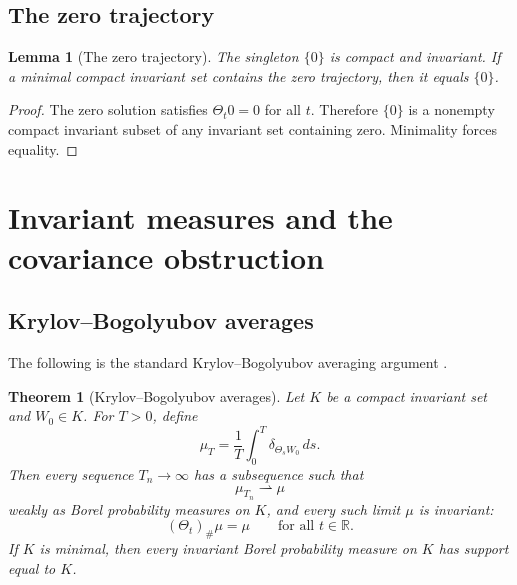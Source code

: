 \documentclass[11pt]{amsart}
\theoremstyle{plain}
\newtheorem{theorem}{Theorem}[section]
\newtheorem{lemma}[lemma]{Lemma}
\theoremstyle{definition}
\theoremstyle{remark}
\numberwithin{equation}{section}
\newcommand{\R}{\mathbb R}
\begin{document}
\subsection{The zero trajectory}

\begin{lemma}[The zero trajectory]\label{p2:lem:zero-trajectory}
The singleton \(\{0\}\) is compact and invariant.  If a minimal compact
invariant set contains the zero trajectory, then it equals \(\{0\}\).
\end{lemma}

\begin{proof}
The zero solution satisfies \(\Theta_t0=0\) for all \(t\).  Therefore
\(\{0\}\) is a nonempty compact invariant subset of any invariant set
containing zero.  Minimality forces equality.
\end{proof}

\section{Invariant measures and the covariance obstruction}
\label{p2:sec:measures-covariance}

\subsection{Krylov--Bogolyubov averages}

The following is the standard Krylov--Bogolyubov averaging argument
\cite{KryloffBogoliouboff1937,Billingsley1999}.

\begin{theorem}[Krylov--Bogolyubov averages]\label{p2:thm:KB}
Let \(K\) be a compact invariant set and \(W_0\in K\).  For \(T>0\), define
\[
   \mu_T
   =
   \frac1T\int_0^T\delta_{\Theta_sW_0}\,ds .
\]
Then every sequence \(T_n\to\infty\) has a subsequence such that
\[
   \mu_{T_n}\rightharpoonup\mu
\]
weakly as Borel probability measures on \(K\), and every such limit \(\mu\)
is invariant:
\[
   (\Theta_t)_\#\mu=\mu
   \qquad\text{for all }t\in\R .
\]
If \(K\) is minimal, then every invariant Borel probability measure on \(K\)
has support equal to \(K\).
\end{theorem}
\end{document}
